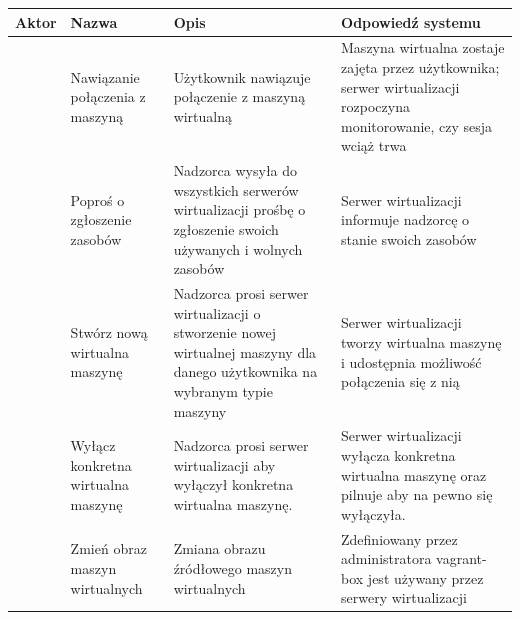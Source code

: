\documentclass[12pt]{article}
\begin{document}
\newpage
\begin{center}
	\begin{table}[h!]
		\begin{tabular}{|p{}|p{}|p{}|p{}|}
			\hline Aktor                                    & Nazwa                                 & Opis                                                                                                                         & Odpowiedź systemu                                                                                                                \\ \hline
			\multirow{5}{=}{\rotatebox{90}{Użytkownik}}     & Nawiązanie połączenia z maszyną       & Użytkownik nawiązuje połączenie z maszyną wirtualną                                                                          & Maszyna wirtualna zostaje zajęta przez użytkownika; serwer wirtualizacji rozpoczyna monitorowanie, czy sesja wciąż trwa \newline \\ \hline
			\multirow{13}{=}{\rotatebox{90}{Nadzorca}}      & Poproś o zgłoszenie zasobów           & Nadzorca wysyła do wszystkich serwerów wirtualizacji prośbę o zgłoszenie swoich używanych i wolnych zasobów                  & Serwer wirtualizacji informuje nadzorcę o stanie swoich zasobów                                                                  \\ \cline{2-4}
			                                                & Stwórz nową wirtualna maszynę         & Nadzorca prosi serwer wirtualizacji o stworzenie nowej wirtualnej maszyny dla danego użytkownika na wybranym typie maszyny   & Serwer wirtualizacji tworzy wirtualna maszynę i udostępnia możliwość połączenia się z nią                                        \\ \cline{2-4}
			                                                & Wyłącz konkretna wirtualna maszynę    & Nadzorca prosi serwer wirtualizacji aby wyłączył konkretna wirtualna maszynę.                                                & Serwer wirtualizacji wyłącza konkretna wirtualna maszynę oraz pilnuje aby na pewno się wyłączyła.                                \\ \hline
			\multirow{11}{=}{\rotatebox{90}{Administrator}} & Zmień obraz maszyn wirtualnych        & Zmiana obrazu źródłowego maszyn wirtualnych                                                                                  & Zdefiniowany przez administratora vagrant-box jest używany przez serwery wirtualizacji                                           \\ \cline{2-4}

\end{tabular}
\end{table}
\end{center}
\end{document}
